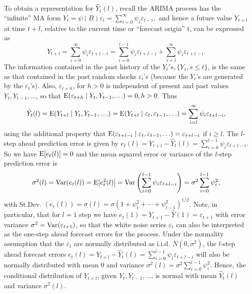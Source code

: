 To obtain a representation for $\hat{Y}_t(l)$, recall the ARIMA process has the ``infinite'' MA form $Y_t = \psi(B) \varepsilon_t = \sum_{i=0}^{\infty}\psi_i \varepsilon_{t-i},$ and hence a future value $Y_{t+l}$ at time $t+l$, relative to the current time or ``forecast origin'' t, can be expressed as
	\begin{equation} \label{eqn:2ytl}
	Y_{t+l} = \sum_{i=0}^\infty \psi_i \varepsilon_{t+l-i} = \sum_{i=0}^{l-1} \psi_i \varepsilon_{t+l-i} + \sum_{i=l}^\infty \psi_i \varepsilon_{t+l-i}.
	\end{equation}
The information contained in the past history of the $Y_t's, \{ Y_s, s \leq t \}$, is the same as that contained in the past random shocks $\varepsilon_t$'s (because the $Y_t$'s are generated by the $\varepsilon_t$'s). Also, $\varepsilon_{t+h}$, for $h > 0$ is independent of present and past values $Y_{t}, Y_{t-1}, \ldots$, so that $\operatorname{E}(\varepsilon_{t+h} \;|\; Y_t,Y_{t-1},\ldots) = 0, h>0$. Thus
	\begin{equation} \label{eqn:2yhatt}
	\hat{Y}_t(l) = \Ex(Y_{t+l} \;|\; Y_t,Y_{t-1},\ldots) = \Ex(Y_{t+l} \;|\; \varepsilon_t, \varepsilon_{t-1}, \ldots) = \sum_{i=l}^\infty \psi_i \varepsilon_{t+l-i},
	\end{equation}
using the additional property that $\operatorname{E}(\varepsilon_{t+l-i} \;|\; \varepsilon_t,  \varepsilon_{t-1}, \ldots) = \varepsilon_{t+l-i}$ if $i \geq l$. The $l$-step ahead prediction error is given by $e_t(l) = Y_{t+l} - \hat{Y}_t(l) = \sum_{i=0}^{l-1} \psi_i \varepsilon_{t+l-i}$. So we have $\operatorname{E}[e_t(l)]=0$ and the mean squared error or variance of the $l$-step prediction error is
	\begin{equation} \label{eqn:2sigmasq}
	\sigma^2(l) = \var(e_t(l)) = \Ex[e_t^2(l)] = \var \left(\sum_{i=0}^{l-1} \psi_i \varepsilon_{t+l-i} \right) = \sigma^2 \sum_{i=0}^{l-1} \psi_i^2,
	\end{equation}
with St.Dev. $(e_t(l)) = \sigma(l) = \sigma(1 + \psi_1^2 + \cdots + \psi_{l-1}^2)^{1/2}$. Note, in particular, that for $l = 1$ step we have $e_t(1) = Y_{t+1} - \hat{Y}(1) = \varepsilon_{t+1}$ with error variance $\sigma^2 = \operatorname{Var}(\varepsilon_{t+1})$, so that the white noise series $\varepsilon_t$ can also be interpreted as the one-step ahead forecast errors for the process. Under the normality assumption that the $\varepsilon_t$ are normally distributed as i.i.d. $N(0, \sigma^2)$, the $l$-step ahead forecast errors $e_t(l) = Y_{t+l} - \hat{Y}_t(l) = \sum_{i=0}^{l-1} \psi_i \varepsilon_{t+l-i}$ will also be normally distributed with mean 0 and variance $\sigma^2(l) = \sigma^2 \sum_{i=0}^{l-1} \psi_i^2$. Hence, the conditional distribution of $Y_{t+l}$, given $Y_t,Y_{t-1}, \ldots$, is normal with mean $\hat{Y}_t(l)$ and variance $\sigma^2(l)$.


